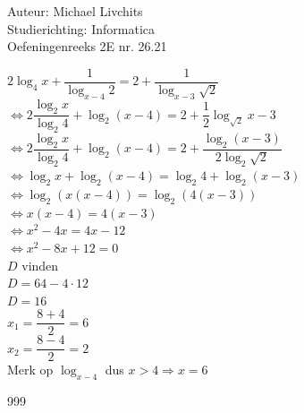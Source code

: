 \documentclass[a4paper]{article}
\begin{document}
  
\noindent \large Auteur: Michael Livchits \\
\noindent \large Studierichting: Informatica\\
\noindent \large Oefeningenreeks 2E nr. 26.21\\

\medskip

\normalsize

$2\log_4{x}+\dfrac{1}{\log_{x-4}{2}} = 2+\dfrac{1}{\log_{x-3}{\sqrt{2}}}$\\

$\Leftrightarrow2\dfrac{\log_2{x}}{\log_2{4}}+\log_{2}\left({x-4}\right) = 2+\dfrac{1}{2}\log_{\sqrt{2}}{x-3}$\\

$\Leftrightarrow2\dfrac{\log_2{x}}{\log_2{4}}+\log_{2}\left({x-4}\right) = 2+\dfrac{\log_2\left({x-3}\right)}{2\log_{2}{\sqrt{2}}}$\\

$\Leftrightarrow\log_2{x}+\log_{2}\left({x-4}\right) = \log_2{4}+\log_2\left({x-3}\right)$\\

$\Leftrightarrow\log_2\left({x\left(x-4\right)}\right)= \log_2\left({4\left(x-3\right)}\right)$\\

$\Leftrightarrow x(x-4) = 4(x-3) $\\

$\Leftrightarrow x^2 - 4x = 4x - 12 $\\

$\Leftrightarrow x^2 - 8x + 12 = 0 $\\

$D$ vinden\\

$D = 64 - 4\cdot12$\\

$D = 16$\\

$x_1 = \dfrac{8+4}{2} = 6$\\

$x_2 = \dfrac{8-4}{2} = 2$\\

Merk op $\log_{x-4}$ dus $x > 4 \Rightarrow x = 6$

\begin{thebibliography}{999}
\end{thebibliography}
\end{document}
